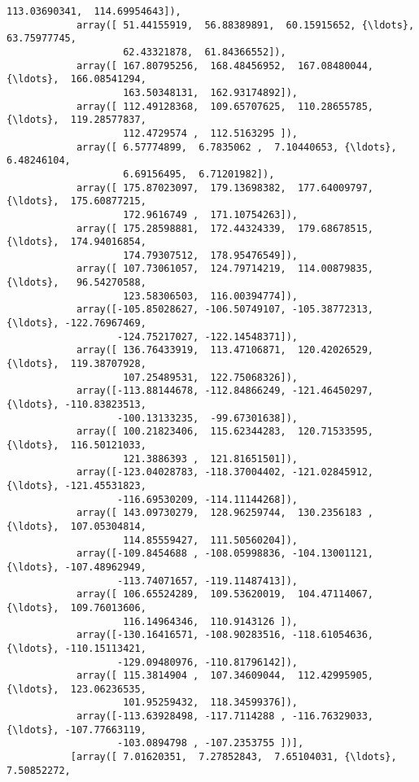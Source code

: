 \documentclass[11pt]{article}
\begin{document}
\begin{Verbatim}[commandchars=\\\{\}]
                    113.03690341,  114.69954643]),
            array([ 51.44155919,  56.88389891,  60.15915652, {\ldots},  63.75977745,
                    62.43321878,  61.84366552]),
            array([ 167.80795256,  168.48456952,  167.08480044, {\ldots},  166.08541294,
                    163.50348131,  162.93174892]),
            array([ 112.49128368,  109.65707625,  110.28655785, {\ldots},  119.28577837,
                    112.4729574 ,  112.5163295 ]),
            array([ 6.57774899,  6.7835062 ,  7.10440653, {\ldots},  6.48246104,
                    6.69156495,  6.71201982]),
            array([ 175.87023097,  179.13698382,  177.64009797, {\ldots},  175.60877215,
                    172.9616749 ,  171.10754263]),
            array([ 175.28598881,  172.44324339,  179.68678515, {\ldots},  174.94016854,
                    174.79307512,  178.95476549]),
            array([ 107.73061057,  124.79714219,  114.00879835, {\ldots},   96.54270588,
                    123.58306503,  116.00394774]),
            array([-105.85028627, -106.50749107, -105.38772313, {\ldots}, -122.76967469,
                   -124.75217027, -122.14548371]),
            array([ 136.76433919,  113.47106871,  120.42026529, {\ldots},  119.38707928,
                    107.25489531,  122.75068326]),
            array([-113.88144678, -112.84866249, -121.46450297, {\ldots}, -110.83823513,
                   -100.13133235,  -99.67301638]),
            array([ 100.21823406,  115.62344283,  120.71533595, {\ldots},  116.50121033,
                    121.3886393 ,  121.81651501]),
            array([-123.04028783, -118.37004402, -121.02845912, {\ldots}, -121.45531823,
                   -116.69530209, -114.11144268]),
            array([ 143.09730279,  128.96259744,  130.2356183 , {\ldots},  107.05304814,
                    114.85559427,  111.50560204]),
            array([-109.8454688 , -108.05998836, -104.13001121, {\ldots}, -107.48962949,
                   -113.74071657, -119.11487413]),
            array([ 106.65524289,  109.53620019,  104.47114067, {\ldots},  109.76013606,
                    116.14964346,  110.9143126 ]),
            array([-130.16416571, -108.90283516, -118.61054636, {\ldots}, -110.15113421,
                   -129.09480976, -110.81796142]),
            array([ 115.3814904 ,  107.34609044,  112.42995905, {\ldots},  123.06236535,
                    101.95259432,  118.34599376]),
            array([-113.63928498, -117.7114288 , -116.76329033, {\ldots}, -107.77663119,
                   -103.0894798 , -107.2353755 ])],
           [array([ 7.01620351,  7.27852843,  7.65104031, {\ldots},  7.50852272,

\end{Verbatim}
\end{document}
